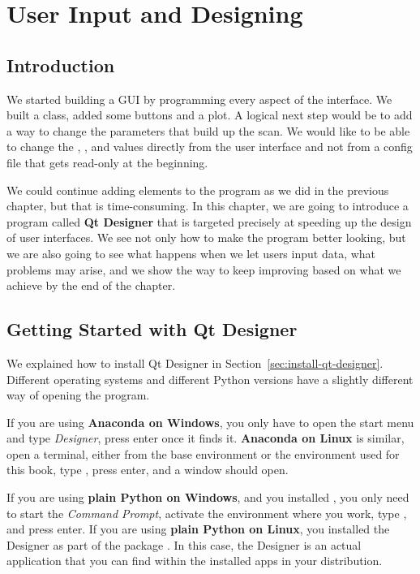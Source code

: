 \chapter{User Input and Designing}\label{ch:user-input-designer}

\section{Introduction}\label{sec:user-input-introduction}
We started building a GUI by programming every aspect of the interface. We built a  class, added some buttons and a plot. A logical next step would be to add a way to change the parameters that build up the scan. We would like to be able to change the , , and  values directly from the user interface and not from a config file that gets read-only at the beginning.

We could continue adding elements to the program as we did in the previous chapter, but that is time-consuming. In this chapter, we are going to introduce a program called \textbf{Qt Designer} that is targeted precisely at speeding up the design of user interfaces. We see not only how to make the program better looking, but we are also going to see what happens when we let users input data, what problems may arise, and we show the way to keep improving based on what we achieve by the end of the chapter.

\section{Getting Started with Qt Designer}\label{sec:getting-started-with-qt-designer}
We explained how to install Qt Designer in Section~\ref{sec:install-qt-designer}. Different operating systems and different Python versions have a slightly different way of opening the program.

If you are using \textbf{Anaconda on Windows}, you only have to open the start menu and type \textit{Designer}, press \py{}enter once it finds it. \textbf{Anaconda on Linux} is similar, open a terminal, either from the base environment or the environment used for this book, type , press enter, and a window should open.

If you are using \textbf{plain Python on Windows}, and you installed , you only need to start the \emph{Command Prompt}, activate the environment where you work, type , and press enter. If you are using \textbf{plain Python on Linux}, you installed the Designer as part of the package . In this case, the Designer is an actual application that you can find within the installed apps in your distribution.

